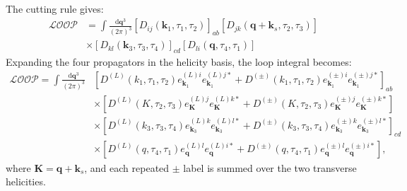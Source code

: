 \documentclass[a4paper,12pt]{article}
\def\di{{\mathrm{d}}}
\def\mb{\mathbf}
\begin{document}
The cutting rule gives:
\begin{align}
    \mathcal{LOOP} &= 
    \int \frac{\di \mb{q}^3}{(2\pi)^3} 
    \left[ D_{ij}(\mb k_1,\tau_1,\tau_2) \right]_{ab} 
    \left[ D_{jk}(\mb q+\mb k_s,\tau_2,\tau_3) \right] \nonumber \\
    &\times \left[ D_{kl}( \mb{k}_3,\tau_3,\tau_4) \right]_{cd}
    \left[ D_{li}( \mb{q},\tau_4,\tau_1) \right]
\end{align}
Expanding the four propagators in the helicity basis, the loop integral becomes:
\begin{align}
    \mathcal{LOOP}
    =\int\frac{\di\mb q^3}{(2\pi)^3}
    &\left[D^{(L)}(k_1,\tau_1,\tau_2)
    e^{(L)i}_{\mb k_1}e^{(L)j*}_{\mb k_1}
    +D^{(\pm)}(k_1,\tau_1,\tau_2)
    e^{(\pm)i}_{\mb k_1}e^{(\pm)j*}_{\mb k_1}\right]_{ab} \nonumber \\
    &\times\left[D^{(L)}(K,\tau_2,\tau_3)
    e^{(L)j}_{\mb K}e^{(L)k*}_{\mb K}
    +D^{(\pm)}(K,\tau_2,\tau_3)
    e^{(\pm)j}_{\mb K}e^{(\pm)k*}_{\mb K}\right] \nonumber \\
    &\times\left[D^{(L)}(k_3,\tau_3,\tau_4)
    e^{(L)k}_{\mb k_3}e^{(L)l*}_{\mb k_3}
    +D^{(\pm)}(k_3,\tau_3,\tau_4)
    e^{(\pm)k}_{\mb k_3}e^{(\pm)l*}_{\mb k_3}\right]_{cd} \nonumber \\
    &\times\left[D^{(L)}(q,\tau_4,\tau_1)
    e^{(L)l}_{\mb q}e^{(L)i*}_{\mb q}
    +D^{(\pm)}(q,\tau_4,\tau_1)
    e^{(\pm)l}_{\mb q}e^{(\pm)i*}_{\mb q}\right],
\end{align}
where $\mb K=\mb q+\mb k_s$, and each repeated $\pm$ label is summed over the two transverse helicities.
\end{document}
